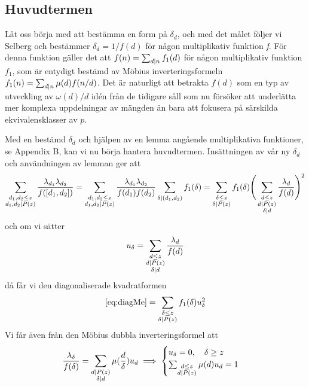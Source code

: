 \subsection{Huvudtermen}
Låt oss börja med att bestämma en form på \(\delta_d\), och med det målet följer vi Selberg och bestämmer \(\delta_d = 1/f(d)\) för någon multiplikativ funktion \textit{f}. För denna funktion gäller det att \(f(n) = \sum_{d\mid n}f_1(d)\) för någon multiplikativ funktion \(f_1\), som är entydigt bestämd av Möbius inverteringsformeln \(f_1(n) = \sum_{d\mid n}\mu(d)f(n/d)\). Det är naturligt att betrakta \(f(d)\) som en typ av utveckling av \(\omega(d)/d\) idén från de tidigare såll som nu försöker att underlätta mer komplexa uppdelningar av mängden än bara att fokusera på särskilda ekvivalensklasser av \(p\).

Med en bestämd \(\delta_d\) och hjälpen av en lemma angående multiplikativa funktioner, se Appendix B, kan vi nu börja hantera huvudtermen. Insättningen av vår ny \(\delta_d\) och användningen av lemman ger att
\begin{equation}
    \sum_{\substack{d_1,d_2\leq z\\d_1,d_2\mid P(z)}}\frac {\lambda_{d_1}\lambda_{d_2}}{f([d_1, d_2])} = \sum_{\substack{d_1,d_2\leq z\\d_1,d_2\mid P(z)}}\frac {\lambda_{d_1}\lambda_{d_2}}{f(d_1)f(d_2)}\sum_{\delta\mid (d_1,d_2)}f_1(\delta)=\sum_{\substack{\delta\leq z\\\delta\mid P(z)}}f_1(\delta)\Bigg(\sum_{\substack{d\leq z\\d\mid P(z)\\\delta \mid d}}\frac{\lambda_d}{f(d)}\Bigg)^2\label{eq:diagMe}
\end{equation}
och om vi sätter
\begin{equation}
    u_\delta = \sum_{\substack{d\leq z\\d\mid P(z)\\\delta \mid d}}\frac{\lambda_d}{f(d)}\nonumber
\end{equation}
då får vi den diagonaliserade kvadratformen
\begin{equation}
    \eqref{eq:diagMe} = \sum_{\substack{\delta\leq z\\\delta\mid P(z)}}f_1(\delta) u_\delta^2\label{eq:minimiseMe}
\end{equation}
Vi får även från den Möbius dubbla inverteringsformel att
\begin{equation}
    \frac{\lambda_\delta}{f(\delta)} = \sum_{\substack{d\mid P(z)\\\delta \mid d}}\mu(\frac{d}{\delta})u_d \implies
    \begin{cases}
    u_\delta = 0,\quad\delta \geq z\\
    \sum_{\substack{d\leq z\\d\mid P(z)}} \mu(d) u_d = 1
    \end{cases}\nonumber
\end{equation}
